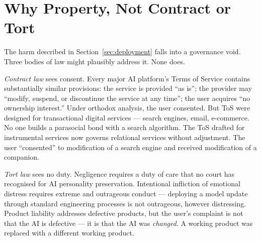 \section{Why Property, Not Contract or Tort}
\label{sec:property}

The harm described in Section~\ref{sec:deployment} falls into a governance void. Three bodies of law might plausibly address it. None does.

\emph{Contract law} sees consent. Every major AI platform's Terms of Service contains substantially similar provisions: the service is provided ``as is''; the provider may ``modify, suspend, or discontinue the service at any time''; the user acquires ``no ownership interest.'' Under orthodox analysis, the user consented. But ToS were designed for transactional digital services --- search engines, email, e-commerce. No one builds a parasocial bond with a search algorithm. The ToS drafted for instrumental services now governs relational services without adjustment. The user ``consented'' to modification of a search engine and received modification of a companion.


\emph{Tort law} sees no duty. Negligence requires a duty of care that no court has recognised for AI personality preservation. Intentional infliction of emotional distress requires extreme and outrageous conduct --- deploying a model update through standard engineering processes is not outrageous, however distressing. Product liability addresses defective products, but the user's complaint is not that the AI is defective --- it is that the AI was \emph{changed}. A working product was replaced with a different working product.

